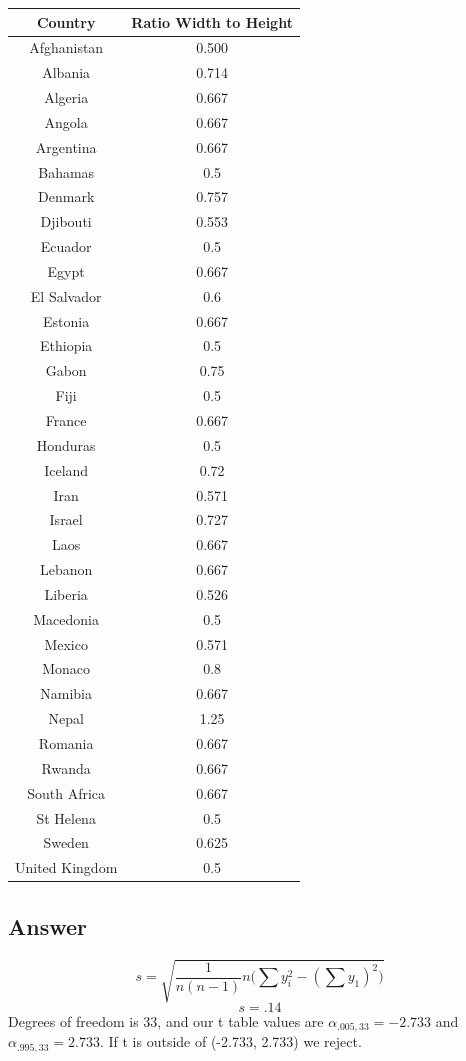 \documentclass[svgnames]{article}
\begin{document}
\begin{table}[h!]
\centering
 \begin{tabular}{c c} 
 \hline
Country & Ratio Width to Height \\ [0.5ex] 
 \hline
 Afghanistan	&	0.500	\\
Albania	&	0.714	\\
Algeria	&	0.667	\\
Angola	&	0.667	\\
Argentina	&	0.667	\\
Bahamas	&	0.5	\\
Denmark	&	0.757	\\
Djibouti	&	0.553	\\
Ecuador	&	0.5	\\
Egypt	&	0.667	\\
El Salvador 	&	0.6	\\
Estonia	&	0.667	\\
Ethiopia	&	0.5	\\
Gabon	&	0.75	\\
Fiji	&	0.5	\\
France	&	0.667	\\
Honduras	&	0.5	\\
Iceland	&	0.72	\\
Iran	&	0.571	\\
Israel	&	0.727	\\
Laos	&	0.667	\\
Lebanon	&	0.667	\\
Liberia	&	0.526	\\
Macedonia	&	0.5	\\
Mexico	&	0.571	\\
Monaco	&	0.8	\\
Namibia	&	0.667	\\
Nepal	&	1.25	\\
Romania	&	0.667	\\
Rwanda	&	0.667	\\
South Africa	&	0.667	\\
St Helena	&	0.5	\\
Sweden	&	0.625	\\
United Kingdom	&	0.5	\\
 [1ex] 
 \hline
 \end{tabular}
\end{table}
\subsection*{Answer}
$$s = \sqrt{\frac{1}{n(n-1)}n\Big( \sum y_i^2 - (\sum y_1)^2 \Big)}$$
$$s = .14$$
Degrees of freedom is 33, and our t table values are $\alpha_{.005,33}= -2.733$ and  $\alpha_{.995,33}= 2.733$. If t is outside of (-2.733, 2.733) we reject.
\end{document}
